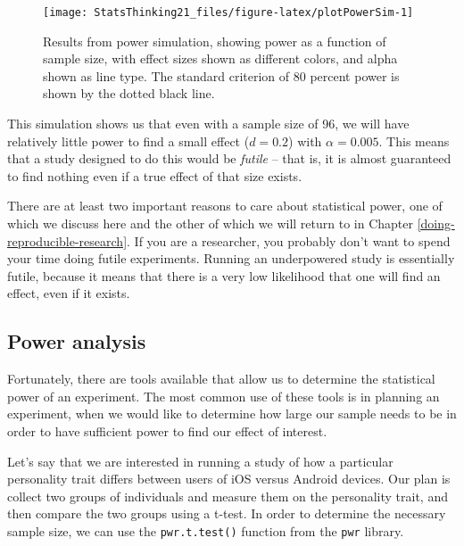 \documentclass[]{book}
\newenvironment{Shaded}{\begin{snugshade}}{\end{snugshade}}
\newcommand{\KeywordTok}[1]{\textcolor[rgb]{0.13,0.29,0.53}{\textbf{#1}}}
\newcommand{\StringTok}[1]{\textcolor[rgb]{0.31,0.60,0.02}{#1}}
\newcommand{\CommentTok}[1]{\textcolor[rgb]{0.56,0.35,0.01}{\textit{#1}}}
\newcommand{\OperatorTok}[1]{\textcolor[rgb]{0.81,0.36,0.00}{\textbf{#1}}}
\newcommand{\NormalTok}[1]{#1}
\theoremstyle{definition}
\theoremstyle{definition}
\theoremstyle{definition}
\theoremstyle{remark}
\begin{document}
\begin{Shaded}
\begin{Highlighting}[]
{{\CommentTok{# run the simulation}
\NormalTok{powerSimResults <-}\StringTok{ }\NormalTok{powerDf }\OperatorTok{%>%}
\StringTok{  }\KeywordTok{do}\NormalTok{(}\KeywordTok{runPowerSim}\NormalTok{(.))}
\end{Highlighting}
\end{Shaded}

\begin{figure}
\texttt{[image: StatsThinking21\_files/figure-latex/plotPowerSim-1]} \caption{Results from power simulation, showing power as a function of sample size, with effect sizes shown as different colors, and alpha shown as line type. The standard criterion of 80 percent power is shown by the dotted black line.}\label{fig:plotPowerSim}
\end{figure}

This simulation shows us that even with a sample size of 96, we will
have relatively little power to find a small effect (\(d = 0.2\)) with
\(\alpha = 0.005\). This means that a study designed to do this would be
\emph{futile} -- that is, it is almost guaranteed to find nothing even
if a true effect of that size exists.

There are at least two important reasons to care about statistical
power, one of which we discuss here and the other of which we will
return to in Chapter \ref{doing-reproducible-research}. If you are a
researcher, you probably don't want to spend your time doing futile
experiments. Running an underpowered study is essentially futile,
because it means that there is a very low likelihood that one will find
an effect, even if it exists.

\subsection{Power analysis}\label{power-analysis}

Fortunately, there are tools available that allow us to determine the
statistical power of an experiment. The most common use of these tools
is in planning an experiment, when we would like to determine how large
our sample needs to be in order to have sufficient power to find our
effect of interest.

Let's say that we are interested in running a study of how a particular
personality trait differs between users of iOS versus Android devices.
Our plan is collect two groups of individuals and measure them on the
personality trait, and then compare the two groups using a t-test. In
order to determine the necessary sample size, we can use the
\texttt{pwr.t.test()} function from the \texttt{pwr} library.
\end{document}
